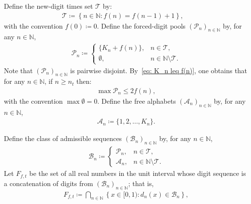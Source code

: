 \documentclass[12pt,reqno]{amsart}
\theoremstyle{definition}
\theoremstyle{plain}
\begin{document}
Define the new-digit times set $\mathcal{T}$ by:
\begin{align*}
    \mathcal{T} \coloneqq \left\{n\in\mathbb{N}: f(n)=f(n-1)+1\right\},
\quad
\end{align*}
with the convention $f(0)\coloneqq0$.
Define the forced-digit pools $(\mathcal{P}_n)_{n\in\mathbb{N}}$ by, for any $n\in\mathbb{N}$,
\begin{align*}
    \mathcal{P}_n \coloneqq
    \begin{cases}
        \{K_n+f(n)\}, & n\in\mathcal{T}, \\
        \emptyset,    & n\in\mathbb{N}\setminus\mathcal{T}.
    \end{cases}
\end{align*}
Note that $(\mathcal{P}_n)_{n\in\mathbb{N}}$ is pairwise disjoint.
By~\eqref{eq: K_n leq f(n)}, one obtains that for any $n\in\mathbb{N}$, if $n\geq n_t$ then:
\begin{align}\label{eq:forcedsize}
    \max{\mathcal{P}_n}\leq2f(n),
\end{align}
with the convention $\max{\emptyset}=0$. Define the free alphabets $(\mathcal{A}_n)_{n\in\mathbb{N}}$ by, for any $n\in\mathbb{N}$,
\begin{align*}
    \mathcal{A}_n\coloneqq \{1,2,\ldots,K_n\}.
\end{align*}

Define the class of admissible sequences $(\mathcal{B}_n)_{n\in\mathbb{N}}$ by, for any $n\in\mathbb{N}$,
\begin{align*}
    \mathcal{B}_n \coloneqq
    \begin{cases}
        \mathcal{P}_n, & n\in\mathcal{T}, \\
        \mathcal{A}_n, & n\in\mathbb{N}\setminus\mathcal{T}.
    \end{cases}
\end{align*}
Let $F_{f,t}$ be the set of all real numbers in the unit interval whose digit sequence is a concatenation of digits from $(\mathcal{B}_n)_{n\in\mathbb{N}}$; that is,
\begin{align*}
    F_{f,t}
    \coloneqq
    \bigcap_{n\in\mathbb{N}}\left\{x\in[0,1):d_{n}(x)\in\mathcal{B}_n\right\},
\end{align*}
\end{document}
